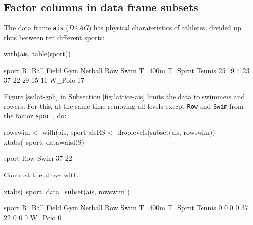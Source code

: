 \documentclass{tufte-book}\usepackage[]{graphicx}\usepackage[]{color}
\newcommand{\txtt}[1]{\texttt{#1}}
\begin{document}
\subsection{Factor columns in data frame subsets}

The data frame \txtt{ais} ({\em DAAG}) has physical charateristics
of athletes, divided up thus between ten different sports:
\begin{fullwidth}
\begin{minipage}[t]{\linewidth}

\begin{Schunk}
\begin{Sinput}
with(ais, table(sport))
\end{Sinput}
\begin{Soutput}
sport
 B_Ball   Field     Gym Netball     Row    Swim  T_400m T_Sprnt  Tennis 
     25      19       4      23      37      22      29      15      11 
 W_Polo 
     17 
\end{Soutput}
\end{Schunk}

\end{minipage}
\end{fullwidth}

Figure \ref{ss:lat-gph} in Subsection \ref{fig:lattice-ais} limits the
data to swimmers and rowers. For this, at the same time removing all
levels except \txtt{Row} and \txtt{Swim} from the factor \txtt{sport},
do:
\begin{Schunk}
\begin{Sinput}
rowswim <- with(ais, sport %
aisRS <- droplevels(subset(ais, rowswim))
xtabs(~sport, data=aisRS)
\end{Sinput}
\begin{Soutput}
sport
 Row Swim 
  37   22 
\end{Soutput}
\end{Schunk}
Contrast the above with:
\begin{fullwidth}

\begin{Schunk}
\begin{Sinput}
xtabs(~sport, data=subset(ais, rowswim))
\end{Sinput}
\begin{Soutput}
sport
 B_Ball   Field     Gym Netball     Row    Swim  T_400m T_Sprnt  Tennis 
      0       0       0       0      37      22       0       0       0 
 W_Polo 
      0 
\end{Soutput}
\end{Schunk}

\end{fullwidth}
\end{document}
